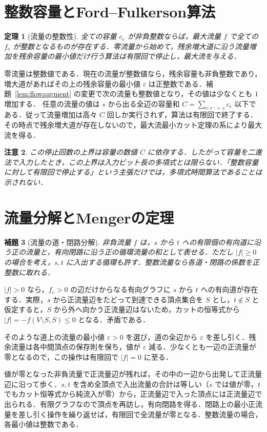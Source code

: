 \documentclass[a5paper,10pt,onecolumn]{jsarticle}
\makeatletter
\theoremstyle{mathnotetheorem}
\newtheorem{theorem}{定理}[section]
\newtheorem{lemma}[theorem]{補題}
\newtheorem{remark}[theorem]{注意}
\renewcommand{\proofname}{証明}
\renewenvironment{proof}[1][\proofname]{%
  \par\pushQED{\qed}\normalfont\topsep4\p@\@plus2\p@\relax
  \trivlist\item[\hskip\labelsep\bfseries #1]\ignorespaces
}{\popQED\endtrivlist\@endpefalse}
\makeatother
\begin{document}
\section{整数容量とFord--Fulkerson算法}
\begin{theorem}[流量の整数性]\label{thm:integerflow}
全ての容量 $c_e$ が非負整数ならば，最大流量 $f$ で全ての $f_e$ が整数となるものが存在する．零流量から始めて，残余増大道に沿う流量増加を残余容量の最小値だけ行う算法は有限回で停止し，最大流を与える．
\end{theorem}
\begin{proof}
零流量は整数値である．現在の流量が整数値なら，残余容量も非負整数であり，増大道があればその上の残余容量の最小値 $\varepsilon$ は正整数である．補題~\ref{lem:flowaugment} の変更で次の流量も整数値となり，その値は少なくとも $1$ 増加する．
任意の流量の値は $s$ から出る全辺の容量和 $C=\sum_{e:e^-=s}c_e$ 以下である．従って流量増加は高々 $C$ 回しか実行されず，算法は有限回で終了する．その時点で残余増大道が存在しないので，最大流最小カット定理の系により最大流を得る．
\end{proof}

\begin{remark}
この停止回数の上界は容量の数値 $C$ に依存する．したがって容量を二進法で入力したとき，この上界は入力ビット長の多項式とは限らない．「整数容量に対して有限回で停止する」という主張だけでは，多項式時間算法であることは示されない．
\end{remark}

\section{流量分解とMengerの定理}
\begin{lemma}[流量の道・閉路分解]\label{lem:decomp}
非負流量 $f$ は，$s$ から $t$ への有限個の有向道に沿う正の流量と，有向閉路に沿う正の循環流量の和として表せる．ただし $|f|\ge0$ の場合を考え，$s,t$ に入出する循環も許す．整数流量なら各道・閉路の係数を正整数に取れる．
\end{lemma}
\begin{proof}
$|f|>0$ なら，$f_e>0$ の辺だけからなる有向グラフに $s$ から $t$ への有向道が存在する．実際，$s$ から正流量辺をたどって到達できる頂点集合を $S$ とし，$t\notin S$ と仮定すると，$S$ から外へ向かう正流量辺はないため，カットの恒等式から $|f|=-f(V\setminus S,S)\le0$ となる．矛盾である．

そのような道上の流量の最小値 $\varepsilon>0$ を選び，道の全辺から $\varepsilon$ を差し引く．残余流量は各中間頂点の保存則を保ち，値が $\varepsilon$ 減る．少なくとも一辺の正流量が零となるので，この操作は有限回で $|f|=0$ に至る．

値が零となった非負流量で正流量辺が残れば，その中の一辺から出発して正流量辺に沿って歩く．$s,t$ を含め全頂点で入出流量の合計は等しい（$s$ では値が零，$t$ でもカット恒等式から純流入が零）から，正流量辺で入った頂点には正流量辺で出られる．有限グラフなので頂点を再訪し，有向閉路を得る．閉路上の最小正流量を差し引く操作を繰り返せば，有限回で全流量が零となる．整数流量の場合，各最小値は整数である．
\end{proof}
\end{document}

